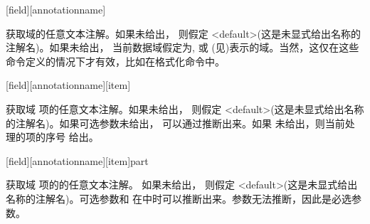 \begin{ltxsyntax}

[field][annotationname]

获取域的任意文本注解。如果未给出，
则假定 <default>(这是未显式给出名称的注解名)。如果未给出，
当前数据域假定为,  或  (见)表示的域。当然，这仅在这些命令定义的情况下才有效，比如在格式化命令中。

[field][annotationname][item]


获取域 项的任意文本注解。如果未给出，
则假定 <default>(这是未显式给出名称的注解名)。如果可选参数未给出，
可以通过推断出来。如果 未给出，则当前处理的项的序号 给出。

[field][annotationname][item]{part}


获取域 项的的任意文本注解。
如果未给出，
则假定 <default>(这是未显式给出名称的注解名)。可选参数和
在中时可以推断出来。参数无法推断，因此是必选参数。



\end{ltxsyntax}
